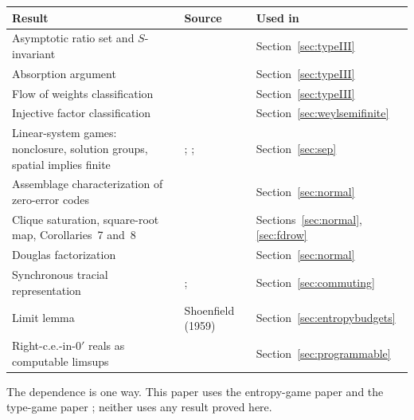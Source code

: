 \begin{center}\footnotesize

\begin{minipage}{\linewidth}
\label{tab:imported-continued}
\begin{tabular}{@{}>{\raggedright\arraybackslash}p{.40\linewidth}>{\raggedright\arraybackslash}p{.27\linewidth}>{\raggedright\arraybackslash}p{.25\linewidth}@{}}
\toprule Result & Source & Used in\\\midrule
Asymptotic ratio set and $S$-invariant & \cite[Section~3.6, Theorem~3.6.1]{Connes} & Section~\ref{sec:typeIII}\\
Absorption argument & \cite[Lemma~3.8]{HM} & Section~\ref{sec:typeIII}\\
Flow of weights classification & \cite{ConnesTakesaki} & Section~\ref{sec:typeIII}\\
Injective factor classification & \cite{Connes76} & Section~\ref{sec:weylsemifinite}\\
Linear-system games: nonclosure, solution groups, spatial implies finite & \cite{SlofstraNonclosed}; \cite[Theorems~4--5]{CLS}; \cite{CM} & Section~\ref{sec:sep}\\
Assemblage characterization of zero-error codes & \cite{CLMW} & Section~\ref{sec:normal}\\
Clique saturation, square-root map, Corollaries~7 and~8 & \cite[Lemma~5, Theorem~6, Corollaries~7--8]{Mancinska} & Sections~\ref{sec:normal}, \ref{sec:fdrow}\\
Douglas factorization & \cite{Douglas} & Section~\ref{sec:normal}\\
Synchronous tracial representation & \cite[Theorem~5.5]{PSS}; \cite{KPS,MNY} & Section~\ref{sec:commuting}\\
Limit lemma & Shoenfield (1959) \cite{Shoenfield} & Section~\ref{sec:entropybudgets}\\
Right-c.e.-in-$0'$ reals as computable limsups & \cite[Lemma~4]{BBS} & Section~\ref{sec:programmable}\\
\bottomrule
\end{tabular}
\end{minipage}
\end{center}


The dependence is one way. This paper uses the entropy-game paper \cite{Entropy} and the type-game paper \cite{ReadType}; neither uses any result proved here.

